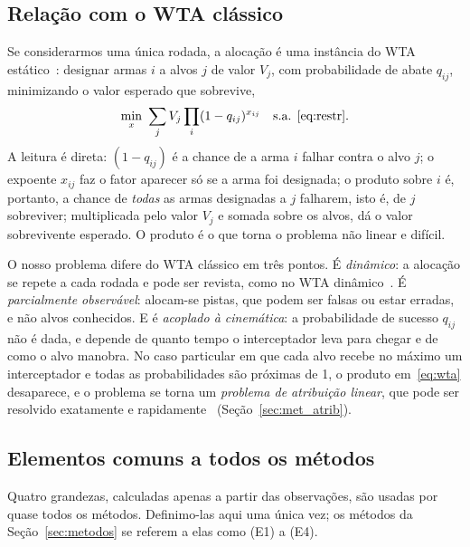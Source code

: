 \subsection{Relação com o WTA clássico}
Se considerarmos uma única rodada, a alocação é uma instância do WTA estático~\cite{manne1958}: designar armas $i$ a alvos
$j$ de valor $V_j$, com probabilidade de abate $q_{ij}$, minimizando o valor esperado que sobrevive,
\begin{equation}
  \min_{x}\ \sum_{j} V_j \prod_{i} (1-q_{ij})^{x_{ij}}\quad\text{s.a. \eqref{eq:restr}}.
  \label{eq:wta}
\end{equation}
A leitura é direta: $(1-q_{ij})$ é a chance de a arma $i$ falhar contra o alvo $j$; o expoente $x_{ij}$ faz o fator
aparecer só se a arma foi designada; o produto sobre $i$ é, portanto, a chance de \emph{todas} as armas designadas a $j$
falharem, isto é, de $j$ sobreviver; multiplicada pelo valor $V_j$ e somada sobre os alvos, dá o valor sobrevivente
esperado. O produto é o que torna o problema não linear e difícil.

O nosso problema difere do WTA clássico em três pontos. É \emph{dinâmico}: a alocação se repete a cada rodada e pode
ser revista, como no WTA dinâmico~\cite{hosein1990}. É \emph{parcialmente observável}: alocam-se pistas, que podem ser
falsas ou estar erradas, e não alvos conhecidos. E é \emph{acoplado à cinemática}: a probabilidade de sucesso $q_{ij}$
não é dada, e depende de quanto tempo o interceptador leva para chegar e de como o alvo manobra. No caso particular em que
cada alvo recebe no máximo um interceptador e todas as probabilidades são próximas de 1, o produto em~\eqref{eq:wta}
desaparece, e o problema se torna um \emph{problema de atribuição linear}, que pode ser resolvido exatamente e
rapidamente~\cite{kuhn1955} (Seção~\ref{sec:met_atrib}).

\subsection{Elementos comuns a todos os métodos}\label{sec:comuns}
Quatro grandezas, calculadas apenas a partir das observações, são usadas por quase todos os métodos. Definimo-las aqui
uma única vez; os métodos da Seção~\ref{sec:metodos} se referem a elas como (E1) a (E4).

